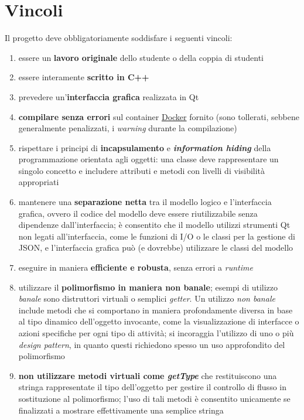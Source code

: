 \documentclass[10pt,a4paper,oneside]{article}
\begin{document}
\section{Vincoli}
Il progetto deve obbligatoriamente soddisfare i seguenti vincoli:
\begin{enumerate}
 \item essere un \textbf{lavoro originale} dello studente o della coppia di studenti
 \item essere interamente \textbf{scritto in C++}
 \item prevedere un'\textbf{interfaccia grafica} realizzata in Qt
 \item \textbf{compilare senza errori} sul container \href{https://www.docker.com/}{Docker} fornito (sono tollerati, sebbene generalmente penalizzati, i \emph{warning} durante la compilazione)
 \item rispettare i principi di \textbf{incapsulamento} e \textbf{\emph{information hiding}} della programmazione orientata agli oggetti: una classe deve rappresentare un singolo concetto e includere attributi e metodi con livelli di visibilità appropriati
 \item mantenere una \textbf{separazione netta} tra il modello logico e l'interfaccia grafica, ovvero il codice del modello deve essere riutilizzabile senza dipendenze dall'interfaccia; è consentito che il modello utilizzi strumenti Qt non legati all'interfaccia, come le funzioni di I/O o le classi per la gestione di JSON, e l'interfaccia grafica può (e dovrebbe) utilizzare le classi del modello
 \item eseguire in maniera \textbf{efficiente e robusta}, senza errori a \emph{runtime}
 \item utilizzare il \textbf{polimorfismo in maniera non banale}; esempi di utilizzo \emph{banale} sono distruttori virtuali o semplici \emph{getter}. Un utilizzo \emph{non banale} include metodi che si comportano in maniera profondamente diversa in base al tipo dinamico dell'oggetto invocante, come la visualizzazione di interfacce o azioni specifiche per ogni tipo di attività; si incoraggia l'utilizzo di uno o più \emph{design pattern}, in quanto questi richiedono spesso un uso approfondito del polimorfismo
 \item \textbf{non utilizzare metodi virtuali come \emph{getType}} che restituiscono una stringa rappresentate il tipo dell'oggetto per gestire il controllo di flusso in sostituzione al polimorfismo; l'uso di tali metodi è consentito unicamente se finalizzati a mostrare effettivamente una semplice stringa

\end{enumerate}
\end{document}
